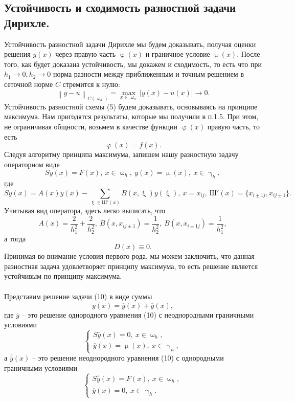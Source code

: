\documentclass[a4paper, 12pt]{report}
\numberwithin{equation}{section}
\newcommand{\ol}{\overline}
\renewcommand{\gamma}{\upgamma}
\renewcommand{\varphi}{\upvarphi}
\renewcommand{\mu}{\upmu}
\renewcommand{\omega}{\upomega}
\renewcommand{\xi}{\upxi}
\newcommand\Norm[1]{\left\| #1 \right\|}
\begin{document}
	\subsection{Устойчивость и сходимость разностной задачи Дирихле.}
	Устойчивость разностной задачи Дирихле мы будем доказывать, получая оценки решения $y(x)$ через правую часть $\varphi(x)$ и граничное условие $\mu(x)$. После того, как будет доказана устойчивость, мы докажем и сходимость, то есть что при $h_1\to 0, h_2\to0$ норма разности между приближенным и точным решением в сеточной норме $C$ стремится к нулю:
	$$\Norm{y - u}_{C(\omega_h)} = \underset{x \in \omega_h}{\max}|y(x) - u(x)| \to 0.$$
	Устойчивость разностной схемы (5) будем доказывать, основываясь на принципе максимума. Нам пригодятся результаты, которые мы получили в п.1.5. При этом, не ограничивая общности, возьмем в качестве функции $\varphi(x)$ правую часть, то есть
	$$\varphi(x) = f(x).$$
	Следуя алгоритму принципа максимума, запишем нашу разностную задачу операторном виде
	\begin{equation}
		Sy(x) = F(x), \ x\in \omega_h,\ y(x) = \mu(x),\ x \in \gamma _h,
	\end{equation}
	где
	$$Sy(x) = A(x) y(x) - \sum_{\xi \in \text{Ш}'(x)}B(x,\xi)y(\xi) ,\ x=x_{ij},\ \text{Ш}'(x) = \{x_{i\pm 1j}, x_{ij\pm 1}\}.$$
	Учитывая вид оператора, здесь легко выписать, что
	$$A(x) = \dfrac{2}{h_1^2} + \dfrac{2}{h_2^2},\ B(x,x_{ij\pm1})=\dfrac{1}{h_2^2}, \ B(x, x_{i\pm 1 j}) = \dfrac{1}{h_1^2},$$
	а тогда $$D(x) \equiv 0.$$
	Принимая во внимание условия первого рода, мы можем заключить, что данная разностная задача удовлетворяет принципу максимума, то есть решение является устойчивым по принципу максимума.\\\\
	Представим решение задачи (10) в виде суммы $$y(x) = \ol y(x) + \ol{\ol y}(x),$$
	где $\ol y $ -- это решение однородного уравнения (10) с неоднородными граничными условиями
	\begin{equation}
		\begin{cases}
		S \ol y (x) = 0,\ x \in \omega_h,\\
		\ol y(x) = \mu(x),\ x \in \gamma_h,
	\end{cases}
	\end{equation}
	а $\ol {\ol y}(x)$ -- это решение неоднородного уравнения (10) с однородными граничными условиями
	\begin{equation}
		\begin{cases}
			S \ol {\ol y}(x) = F(x),\ x \in \omega_h,\\
			\ol {\ol y}(x) = 0,\ x \in \gamma_h.
		\end{cases}
	\end{equation}
\end{document}
